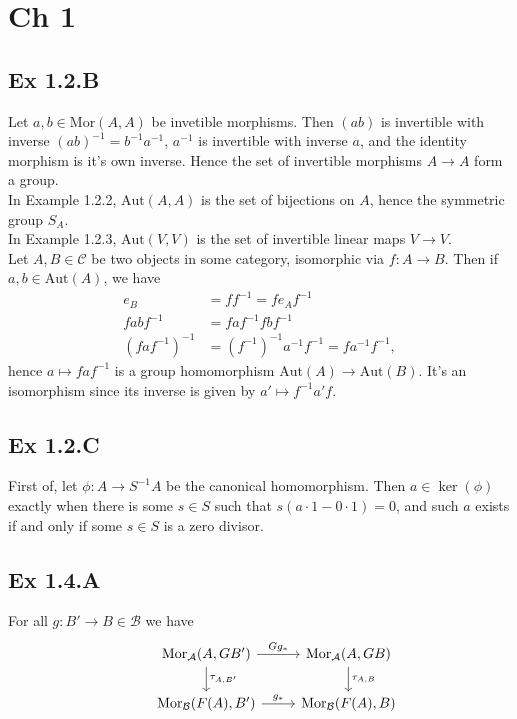 \documentclass{article}
\theoremstyle{definition}
\newcommand{\Aut}{\text{Aut}}
\newcommand{\Mor}{\text{Mor}}
\begin{document}
\section*{Ch 1}

\subsection*{Ex 1.2.B}
Let $a, b \in \Mor(A, A)$ be invetible morphisms. Then $(ab)$ is invertible
with inverse $(ab)^{-1} = b^{-1}a^{-1}$, $a^{-1}$ is invertible with inverse
$a$, and the identity morphism is it's own inverse. Hence the set of invertible
morphisms $A \to A$ form a group. \\

In Example 1.2.2, $\Aut(A, A)$ is the set of bijections on $A$, hence the
symmetric group $S_A$. \\

In Example 1.2.3, $\Aut(V, V)$ is the set of invertible linear maps $V \to V$. \\

Let $A, B \in \mathcal{C}$ be two objects in some category, isomorphic via $f :
	A \to B$. Then if $a, b \in \Aut(A)$, we have
\begin{align*}
	e_B               & = f f^{-1} = f e_A f^{-1}                        \\
	f a b f^{-1}      & = f a f^{-1} f b f^{-1}                          \\
	(f a f^{-1})^{-1} & = (f^{-1})^{-1} a^{-1} f^{-1} = f a^{-1} f^{-1},
\end{align*}
hence $a \mapsto f a f^{-1}$ is a group homomorphism $\Aut(A) \to \Aut(B)$.
It's an isomorphism since its inverse is given by $a' \mapsto f^{-1} a' f$.

\subsection*{Ex 1.2.C}

First of, let $\phi : A \to S^{-1}A$ be the canonical homomorphism. Then $a \in
	\ker(\phi)$ exactly when there is some $s \in S$ such that $s(a \cdot 1 - 0
	\cdot 1) = 0$, and such $a$ exists if and only if some $s \in S$ is a zero
divisor.


\subsection*{Ex 1.4.A}

For all $g : B' \to B \in \mathcal{B}$ we have
\[
	\begin{tikzcd}
		&
		\Mor_{\mathcal{A}}(A, GB')
		\ar[r, "Gg_{*}"]
		\ar[d, "\tau_{A, B'}"]
		&
		\Mor_{\mathcal{A}}(A, GB)
		\ar[d, "\tau_{A, B}"] \\
		&
		\Mor_{\mathcal{B}}(F(A), B')
		\ar[r, "g_{*}"]
		&
		\Mor_{\mathcal{B}}(F(A), B)
	\end{tikzcd}
\]
\end{document}
